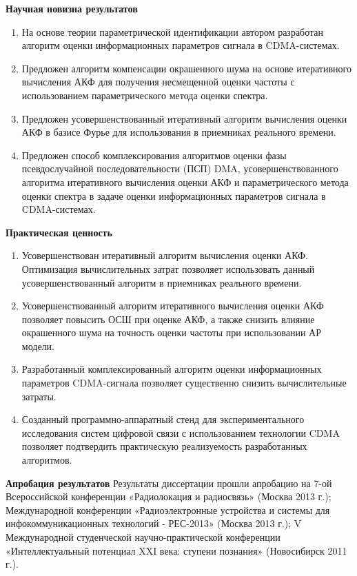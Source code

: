 {\bf{Научная новизна результатов}}
\begin{enumerate}
	\item {На основе теории параметрической идентификации автором разработан алгоритм оценки информационных параметров сигнала в CDMA-системах.}
	\item {Предложен алгоритм компенсации окрашенного шума на основе итеративного вычисления АКФ для получения несмещенной оценки частоты с использованием параметрического метода оценки спектра.}
	\item {Предложен усовершенствованный итеративный алгоритм вычисления оценки АКФ в базисе Фурье для использования в приемниках реального времени.}
	\item {Предложен способ комплексирования алгоритмов оценки фазы псевдослучайной последовательности (ПСП) DMA, усовершенствованного алгоритма итеративного вычисления оценки АКФ и параметрического метода оценки спектра в задаче оценки информационных параметров сигнала в CDMA-системах.}
\end{enumerate}

{\bf{Практическая ценность}}
\begin{enumerate}
	\item {Усовершенствован итеративный алгоритм вычисления оценки АКФ. Оптимизация вычислительных затрат позволяет использовать данный усовершенствованный алгоритм в приемниках реального времени.}
	\item {Усовершенствованный алгоритм итеративного вычисления оценки АКФ позволяет повысить ОСШ при оценке АКФ, а также снизить влияние окрашенного шума на точность оценки частоты при использовании АР модели.}
	\item {Разработанный комплексированный алгоритм оценки информационных параметров CDMA-сигнала позволяет существенно снизить вычислительные затраты.}
	\item {Созданный программно-аппаратный стенд для экспериментального исследования систем цифровой связи с использованием технологии CDMA позволяет подтвердить практическую реализуемость разработанных алгоритмов.}
\end{enumerate}

{\bf{Апробация результатов}}
Результаты диссертации прошли апробацию на 7-ой Всероссийской конференции «Радиолокация и радиосвязь» (Москва 2013 г.); Международной конференции «Радиоэлектронные устройства и системы для инфокоммуникационных технологий - РЕС-2013» (Москва 2013 г.); V Международной студенческой научно-практической конференции «Интеллектуальный потенциал XXI века: ступени познания» (Новосибирск 2011 г.).

